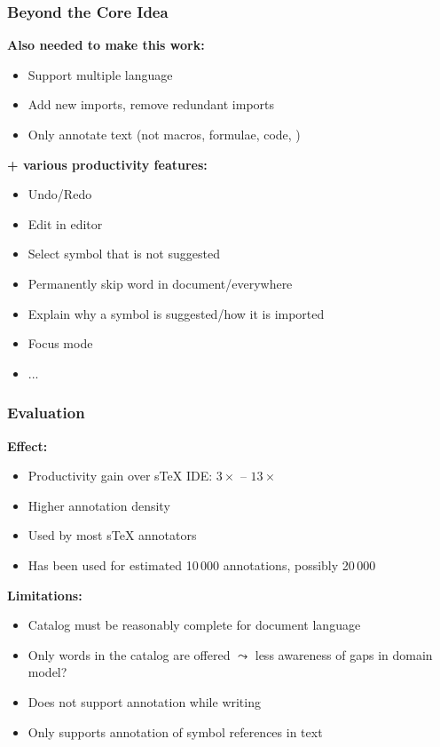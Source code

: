 \documentclass[aspectratio=169]{beamer}
\begin{document}
\begin{frame}
    \frametitle{Beyond the Core Idea}
    \textbf{Also needed to make this work:}
    \begin{itemize}
        \item Support multiple language
        \item Add new imports, remove redundant imports
        \item Only annotate text (not macros, formulae, code, \textellipsis)
    \end{itemize}

    \vspace{1em}
    \textbf{+ various productivity features:}
    \begin{itemize}
        \item Undo/Redo
        \item Edit in editor
        \item Select symbol that is not suggested
        \item Permanently skip word in document/everywhere
        \item Explain why a symbol is suggested/how it is imported
        \item Focus mode
        \item ...
    \end{itemize}
\end{frame}

\begin{frame}
    \frametitle{Evaluation}
    \textbf{Effect:}
    \begin{itemize}
        \item Productivity gain over sTeX IDE: $3\times$ -- $13\times$
        \item Higher annotation density
        \item Used by most sTeX annotators
        \item Has been used for estimated 10\,000 annotations, possibly 20\,000
    \end{itemize}

    \vspace{1em}
    \textbf{Limitations:}
    \begin{itemize}
        \item Catalog must be reasonably complete for document language
        \item Only words in the catalog are offered $\leadsto$ less awareness of gaps in domain model?
        \item Does not support annotation while writing
        \item Only supports annotation of symbol references in text
    \end{itemize}
\end{frame}
\end{document}
